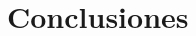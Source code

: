 \documentclass[12pt,letterpaper]{article}
\begin{document}



\section{Conclusiones}

\begin{thebibliography}{99}
\end{thebibliography}
\end{document}

